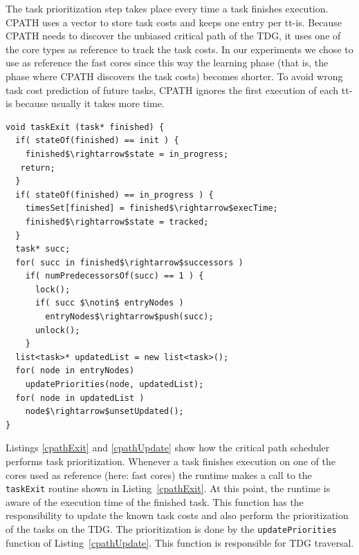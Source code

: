 
The task prioritization step takes place every time a task finishes execution. 
CPATH uses a vector to store task costs and keeps one entry per tt-is.
Because CPATH needs to discover the unbiased critical path of the TDG, it uses one of the core types as reference to track the task costs.
In our experiments we chose to use as reference the fast cores since this way the learning phase (that is, the phase where CPATH discovers the task costs) becomes shorter.
To avoid wrong task cost prediction of future tasks, CPATH ignores the first execution of each tt-is because usually it takes more time. 
\begin{lstlisting}[float, emph={taskExit,updatePriorities,non_critical_queue, critical_queue,submit_task}, caption={Pseudo-code for taskExit, the function called by the cores used as reference for tracking the task costs},label=cpathExit]
void taskExit (task* finished) {
  if( stateOf(finished) == init ) {
    finished$\rightarrow$state = in_progress;
   return;
  }
  if( stateOf(finished) == in_progress ) {
    timesSet[finished] = finished$\rightarrow$execTime;
    finished$\rightarrow$state = tracked;
  }
  task* succ;
  for( succ in finished$\rightarrow$successors ) 
    if( numPredecessorsOf(succ) == 1 ) {
      lock();
      if( succ $\notin$ entryNodes ) 
        entryNodes$\rightarrow$push(succ);
      unlock();
    }
  list<task>* updatedList = new list<task>();
  for( node in entryNodes) 
    updatePriorities(node, updatedList);
  for( node in updatedList ) 
    node$\rightarrow$unsetUpdated();
}
\end{lstlisting}

Listings \ref{cpathExit} and \ref{cpathUpdate} show how the critical path scheduler performs task prioritization.
Whenever a task finishes execution on one of the cores used as reference (here: fast cores) the runtime makes a call to the \texttt{taskExit} routine shown in Listing~\ref{cpathExit}.
At this point, the runtime is aware of the execution time of the finished task.
This function has the responsibility to update the known task costs and also perform the prioritization of the tasks on the TDG.
The prioritization is done by the \texttt{updatePriorities} function of Listing~\ref{cpathUpdate}. 
This function is responsible for TDG traversal.

